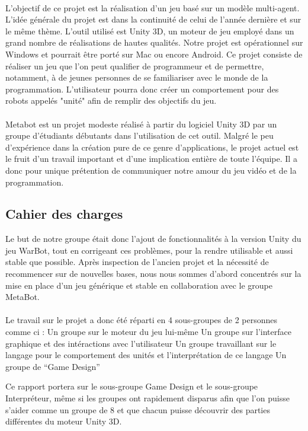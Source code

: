 \documentclass{report}
\begin{document}
\paragraph{}
L'objectif de ce projet est la réalisation d'un jeu basé sur un modèle multi-agent. L'idée générale du projet est dans la continuité de celui de l'année dernière et sur le même thème. L'outil utilisé est Unity 3D, un moteur de jeu employé dans un grand nombre de réalisations de hautes qualités. Notre projet est opérationnel sur Windows et pourrait être porté sur Mac ou encore Android.
Ce projet consiste de réaliser un jeu que l'on peut qualifier de programmeur et de permettre, notamment, à de jeunes personnes de se familiariser avec le monde de la programmation. L'utilisateur pourra donc créer un comportement pour des robots appelés "unité" afin de remplir des objectifs du jeu.
\paragraph{}
Metabot est un projet modeste réalisé à partir du logiciel Unity 3D par un groupe d'étudiants débutants dans l'utilisation de cet outil. Malgré le peu d'expérience dans la création pure de ce genre d'applications, le projet actuel est le fruit d'un travail important et d'une implication entière de toute l'équipe.
Il a donc pour unique prétention de communiquer notre amour du jeu vidéo et de la programmation.
\subsection{Cahier des charges}
Le but de notre groupe était donc l’ajout de fonctionnalités à la version Unity du jeu WarBot, tout en corrigeant ces problèmes, pour la rendre utilisable et aussi stable que possible. 
Après inspection de l’ancien projet et la nécessité de recommencer sur de nouvelles bases, nous nous sommes d’abord concentrés sur la mise en place d’un jeu générique et stable en collaboration avec le groupe MetaBot.
\paragraph{}
Le travail sur le projet a donc été réparti en 4 sous-groupes de 2 personnes comme ci : 
Un groupe sur le moteur du jeu lui-même
Un groupe sur l’interface graphique et des intéractions avec l’utilisateur
Un groupe travaillant sur le langage pour le comportement des unités et l’interprétation de ce langage
Un groupe de “Game Design” 

Ce rapport portera sur le sous-groupe Game Design et le sous-groupe Interpréteur, même si les groupes ont rapidement disparus afin que l’on puisse s’aider comme un groupe de 8 et que chacun puisse découvrir des parties différentes du moteur Unity 3D.
\end{document}

